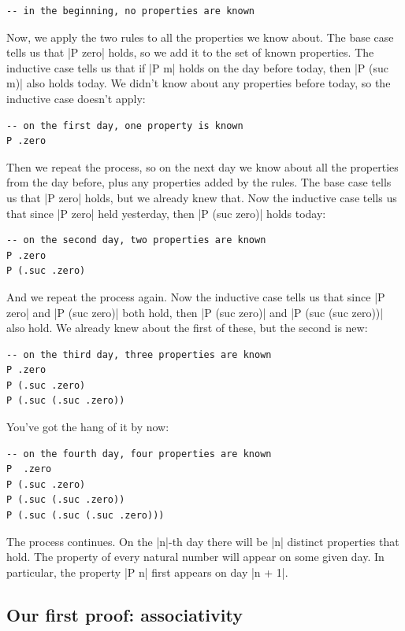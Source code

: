 \documentclass{memoir}
\begin{document}
\par
\par\noindent \begin{verbatim}
-- in the beginning, no properties are known
\end{verbatim}
Now, we apply the two rules to all the properties we know about. The base case
tells us that \LeanVerb|P zero| holds, so we add it to the set of known properties. The
inductive case tells us that if \LeanVerb|P m| holds on the day before today, then
\LeanVerb|P (suc m)| also holds today. We didn’t know about any properties before today,
so the inductive case doesn’t apply:\begin{verbatim}
-- on the first day, one property is known
P .zero
\end{verbatim}
Then we repeat the process, so on the next day we know about all the properties
from the day before, plus any properties added by the rules. The base case
tells us that \LeanVerb|P zero| holds, but we already knew that. Now the inductive case
tells us that since \LeanVerb|P zero| held yesterday, then \LeanVerb|P (suc zero)| holds today:\begin{verbatim}
-- on the second day, two properties are known
P .zero
P (.suc .zero)
\end{verbatim}
And we repeat the process again. Now the inductive case tells us that since
\LeanVerb|P zero| and \LeanVerb|P (suc zero)| both hold, then \LeanVerb|P (suc zero)| and
\LeanVerb|P (suc (suc zero))| also hold. We already knew about the first of these, but
the second is new:\begin{verbatim}
-- on the third day, three properties are known
P .zero
P (.suc .zero)
P (.suc (.suc .zero))
\end{verbatim}
You've got the hang of it by now:\begin{verbatim}
-- on the fourth day, four properties are known
P  .zero
P (.suc .zero)
P (.suc (.suc .zero))
P (.suc (.suc (.suc .zero)))
\end{verbatim}
The process continues. On the \LeanVerb|n|-th day there will be \LeanVerb|n| distinct properties
that hold. The property of every natural number will appear on some given day.
In particular, the property \LeanVerb|P n| first appears on day \LeanVerb|n + 1|.

\par

\subsection{Our first proof: associativity}\label{PLFA--in--Lean----Part--1----Induction-005F-005F-005F--Proof--by--Induction----Our--first--proof-005F-005F-005F--associativity}
\end{document}
